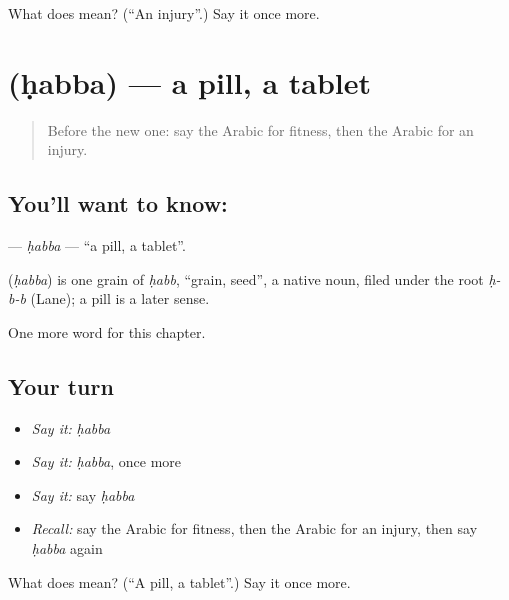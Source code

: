 \begin{tcolorbox}[breakable,colback=teal!4,colframe=teal!35!black,title={Before you move on}]
What does  mean? (\textquotedblleft{}An injury\textquotedblright{}.) Say it once more.
\end{tcolorbox}
\section[\texorpdfstring{\ar{حبة} (ḥabba)}{حبة (ḥabba)}]{ (ḥabba) — a pill, a tablet}

\label{lesson:AR-C169-habba}



\begin{quote}
Before the new one: say the Arabic for fitness, then the Arabic for an injury.
\end{quote}

\subsection*{You'll want to know: }
\textbf{} — \emph{ḥabba} — \textquotedblleft{}a pill, a tablet\textquotedblright{}.

\begin{cousinweb}
\textbf{} (\emph{ḥabba}) is one grain of \emph{ḥabb}, \textquotedblleft{}grain, seed\textquotedblright{}, a native noun, filed under the root \emph{ḥ-b-b} (Lane); a pill is a later sense.
\end{cousinweb}

\begin{grammarlens}[title={What you've built}]
One more word for this chapter.
\end{grammarlens}

\subsection*{Your turn}
\begin{itemize}
\raggedright
  \item \emph{Say it:} \emph{ḥabba}
  \item \emph{Say it:} \emph{ḥabba}, once more
  \item \emph{Say it:} say \emph{ḥabba}
  \item \emph{Recall:} say the Arabic for fitness, then the Arabic for an injury, then say \emph{ḥabba} again
\end{itemize}

\begin{tcolorbox}[breakable,colback=teal!4,colframe=teal!35!black,title={Before you move on}]
What does  mean? (\textquotedblleft{}A pill, a tablet\textquotedblright{}.) Say it once more.
\end{tcolorbox}
